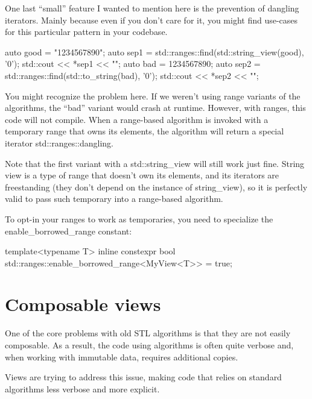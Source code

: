 One last “small” feature I wanted to mention here is the prevention of dangling iterators. Mainly because even if you don’t care for it, you might find use-cases for this particular pattern in your codebase.

\begin{box-note}
\begin{cppcode}
auto good = "1234567890";
auto sep1 = std::ranges::find(std::string_view(good), '0');
std::cout << *sep1 << "\n";
auto bad = 1234567890;
auto sep2 = std::ranges::find(std::to_string(bad), '0');
std::cout << *sep2 << "\n";
\end{cppcode}
\end{box-note}

You might recognize the problem here. If we weren’t using range variants of the algorithms, the “bad” variant would crash at runtime. However, with ranges, this code will not compile. When a range-based algorithm is invoked with a temporary range that owns its elements, the algorithm will return a special iterator std::ranges::dangling.

Note that the first variant with a std::string\_view will still work just fine. String view is a type of range that doesn’t own its elements, and its iterators are freestanding (they don’t depend on the instance of string\_view), so it is perfectly valid to pass such temporary into a range-based algorithm.

To opt-in your ranges to work as temporaries, you need to specialize the enable\_borrowed\_range constant:

\begin{box-note}
\begin{cppcode}
template<typename T>
inline constexpr bool 
    std::ranges::enable_borrowed_range<MyView<T>> = true;
\end{cppcode}
\end{box-note}

\section{Composable views}

One of the core problems with old STL algorithms is that they are not easily composable. As a result, the code using algorithms is often quite verbose and, when working with immutable data, requires additional copies.

Views are trying to address this issue, making code that relies on standard algorithms less verbose and more explicit.


